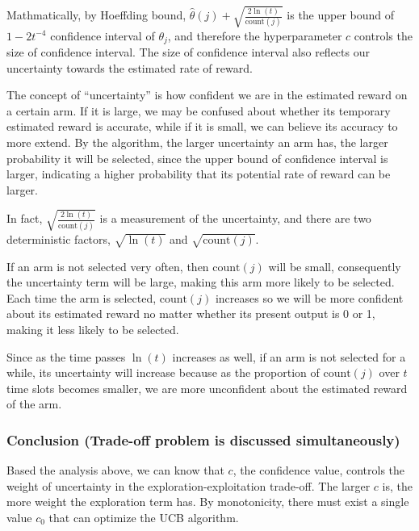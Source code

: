 \documentclass[11pt]{article}
\begin{document}
Mathmatically, by Hoeffding bound,
\(\hat{\theta}(j)+\sqrt{\frac{2\ln(t)}{\text{count}(j)}}\) is the upper
bound of \(1-2t^{-4}\) confidence interval of \(\theta_j\), and
therefore the hyperparameter \(c\) controls the size of confidence
interval. The size of confidence interval also reflects our uncertainty
towards the estimated rate of reward.

The concept of ``uncertainty'' is how confident we are in the estimated
reward on a certain arm. If it is large, we may be confused about
whether its temporary estimated reward is accurate, while if it is
small, we can believe its accuracy to more extend. By the algorithm, the
larger uncertainty an arm has, the larger probability it will be
selected, since the upper bound of confidence interval is larger,
indicating a higher probability that its potential rate of reward can be
larger.

In fact, \(\sqrt{\frac{2\ln(t)}{\text{count}(j)}}\) is a measurement of
the uncertainty, and there are two deterministic factors,
\(\sqrt{\ln(t)}\) and \(\sqrt{\text{count}(j)}\).

If an arm is not selected very often, then \(\text{count}(j)\) will be
small, consequently the uncertainty term will be large, making this arm
more likely to be selected. Each time the arm is selected,
\(\text{count}(j)\) increases so we will be more confident about its
estimated reward no matter whether its present output is 0 or 1, making
it less likely to be selected.

Since as the time passes \(\ln(t)\) increases as well, if an arm is not
selected for a while, its uncertainty will increase because as the
proportion of \(\text{count}(j)\) over \(t\) time slots becomes smaller,
we are more unconfident about the estimated reward of the arm.

    \hypertarget{conclusion-trade-off-problem-is-discussed-simultaneously}{%
\subsubsection{Conclusion (Trade-off problem is discussed
simultaneously)}\label{conclusion-trade-off-problem-is-discussed-simultaneously}}

Based the analysis above, we can know that \(c\), the confidence value,
controls the weight of uncertainty in the exploration-exploitation
trade-off. The larger \(c\) is, the more weight the exploration term
has. By monotonicity, there must exist a single value \(c_0\) that can
optimize the UCB algorithm.
\end{document}
